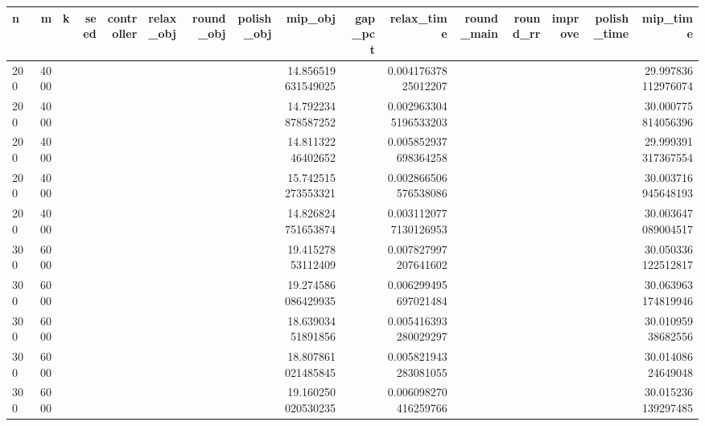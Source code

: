 \begin{tabular}{lrrrrlrrrrrrrrrr}
\hline
n & m & k & seed & controller & relax_obj & round_obj & polish_obj & mip_obj & gap_pct & relax_time & round_main & round_rr & improve & polish_time & mip_time \\ \hline
200 & 4000 &  &  &  &  &  &  & 14.856519631549025 &  & 0.00417637825012207 &  &  &  &  & 29.997836112976074 \\
200 & 4000 &  &  &  &  &  &  & 14.792234878587252 &  & 0.0029633045196533203 &  &  &  &  & 30.000775814056396 \\
200 & 4000 &  &  &  &  &  &  & 14.81132246402652 &  & 0.005852937698364258 &  &  &  &  & 29.999391317367554 \\
200 & 4000 &  &  &  &  &  &  & 15.742515273553321 &  & 0.002866506576538086 &  &  &  &  & 30.003716945648193 \\
200 & 4000 &  &  &  &  &  &  & 14.826824751653874 &  & 0.0031120777130126953 &  &  &  &  & 30.003647089004517 \\
300 & 6000 &  &  &  &  &  &  & 19.41527853112409 &  & 0.007827997207641602 &  &  &  &  & 30.050336122512817 \\
300 & 6000 &  &  &  &  &  &  & 19.274586086429935 &  & 0.006299495697021484 &  &  &  &  & 30.063963174819946 \\
300 & 6000 &  &  &  &  &  &  & 18.63903451891856 &  & 0.005416393280029297 &  &  &  &  & 30.01095938682556 \\
300 & 6000 &  &  &  &  &  &  & 18.807861021485845 &  & 0.005821943283081055 &  &  &  &  & 30.01408624649048 \\
300 & 6000 &  &  &  &  &  &  & 19.160250020530235 &  & 0.006098270416259766 &  &  &  &  & 30.015236139297485 \\
\hline
\end{tabular}
